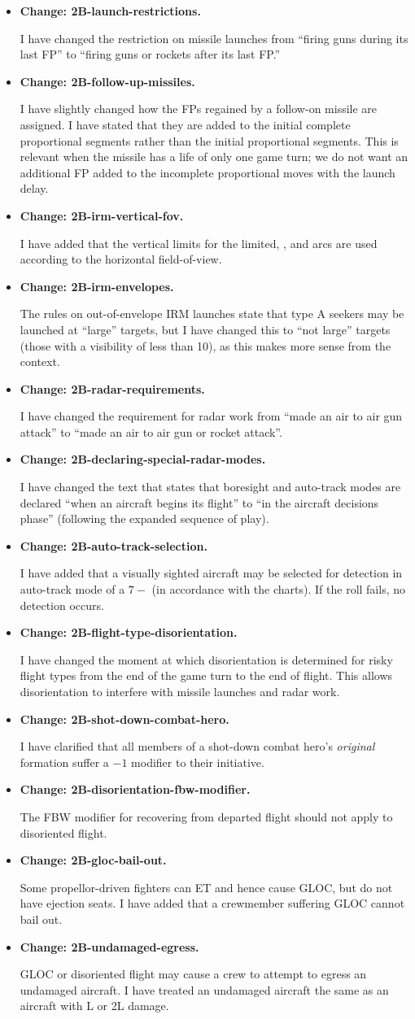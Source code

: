 \documentclass[10pt]{article}
\newcommand{\itemtag}[1]{\item \textbf{Change: #1.}\par}
\begin{document}
\begin{itemize}
    \itemtag{2B-launch-restrictions} I have changed the restriction on missile launches from “firing guns during its last FP” to “firing guns or rockets after its last FP.”

    \itemtag{2B-follow-up-missiles} I have slightly changed how the FPs regained by a follow-on missile are assigned. I have stated that they are added to the initial complete proportional segments rather than the initial proportional segments. This is relevant when the missile has a life of only one game turn; we do not want an additional FP added to the incomplete proportional moves with the launch delay.

    \itemtag{2B-irm-vertical-fov} I have added that the vertical limits for the limited, , and  arcs are used according to the horizontal field-of-view.

    \itemtag{2B-irm-envelopes} The rules on out-of-envelope IRM launches state that type A seekers may be launched at “large” targets, but I have changed this to “not large” targets (those with a visibility of less than 10), as this makes more sense from the context.

    \itemtag{2B-radar-requirements} I have changed the requirement for radar work from “made an air to air gun attack” to “made an air to air gun or rocket attack”.

    \itemtag{2B-declaring-special-radar-modes} I have changed the text that states that boresight and auto-track modes are declared “when an aircraft begins its flight” to “in the aircraft decisions phase” (following the expanded sequence of play).

    \itemtag{2B-auto-track-selection} I have added that a visually sighted aircraft may be selected for detection in auto-track mode of a $7-$ (in accordance with the charts). If the roll fails, no detection occurs.

    \itemtag{2B-flight-type-disorientation} I have changed the moment at which disorientation is determined for risky flight types from the end of the game turn to the end of flight. This allows disorientation to interfere with missile launches and radar work.
    
    \itemtag{2B-shot-down-combat-hero} I have clarified that all members of a shot-down combat hero’s \emph{original} formation suffer a $-1$ modifier to their initiative.
    
    \itemtag{2B-disorientation-fbw-modifier} The FBW modifier for recovering from departed flight should not apply to disoriented flight.

    \itemtag{2B-gloc-bail-out} Some propellor-driven fighters can ET and hence cause GLOC, but do not have ejection seats. I have added that a crewmember suffering GLOC cannot bail out.

    \itemtag{2B-undamaged-egress} GLOC or disoriented flight may cause a crew to attempt to egress an undamaged aircraft. I have treated an undamaged aircraft the same as an aircraft with L or 2L damage.


\end{itemize}
\end{document}
